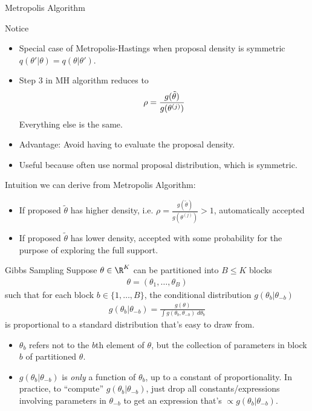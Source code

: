 \documentclass[aspectratio=169, handout]{beamer}
\begin{document}
{\footnotesize
\begin{frame}{Metropolis Algorithm}


Notice
\begin{itemize}
  \item Special case of Metropolis-Hastings when proposal density is
    symmetric $q(\theta'|\theta)=q(\theta|\theta')$.

  \item Step 3 in MH algorithm reduces to
    \begin{align*}
      \rho =
      \frac{%
        g(\tilde{\theta})
      }{%
        g({\theta}^{(j)})
      }
    \end{align*}
    Everything else is \alert{the same}.

  \item \alert{Advantage}: Avoid having to evaluate the proposal
    density.

  \item \alert{Useful} because often use normal proposal distribution,
    which is symmetric.
\end{itemize}
Intuition we can derive from Metropolis Algorithm:
\begin{itemize}
  \item If proposed $\tilde{\theta}$ has higher density, i.e.
    $\rho = \frac{g(\tilde{\theta}) }{ g({\theta}^{(j)}) }>1$,
    \alert{automatically} accepted
  \item If proposed $\tilde{\theta}$ has lower density, accepted with
    \alert{some probability} for the purpose of exploring the full
    support.
\end{itemize}
\end{frame}
}


{\footnotesize
\begin{frame}{Gibbs Sampling}
Suppose $\theta\in\R^K$ can be partitioned into $B\leq K$
blocks
\begin{align*}
  \theta=(\theta_1,\ldots,\theta_B)
\end{align*}
such that for each block $b\in\{1,\ldots,B\}$, the \alert{conditional}
distribution $g(\theta_b|\theta_{-b})$
\begin{align}
  g(\theta_b|\theta_{-b})
  = \frac{g(\theta)}{\int g(\theta_b,\theta_{-b})\;d\theta_b}
  \label{gibbscond}
\end{align}
is proportional to a standard distribution that's easy to draw
from.
\begin{itemize}
  \item $\theta_b$ refers not to the $b$th element of $\theta$, but the
    collection of parameters in block $b$ of partitioned $\theta$.

  \item $g(\theta_b|\theta_{-b})$ is \emph{only} a function of
    $\theta_b$, up to a constant of proportionality.
    In practice, to ``compute'' $g(\theta_b|\theta_{-b})$, just drop all
    constants/expressions involving parameters in $\theta_{-b}$
    to get an expression that's $\propto g(\theta_b|\theta_{-b})$.
\end{itemize}
\end{frame}
}
\end{document}
